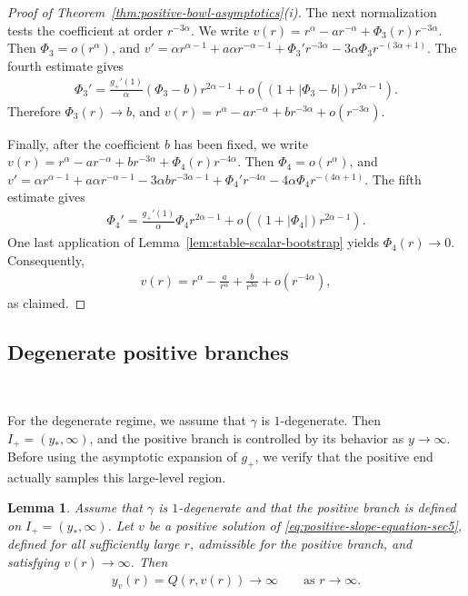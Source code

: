\documentclass{amsart}
\theoremstyle{plain}
\newtheorem{lemma}[theorem]{Lemma}
\theoremstyle{mainintrothm}
\theoremstyle{definition}
\begin{document}
\begin{proof}[Proof of Theorem~\ref{thm:positive-bowl-asymptotics}\textup{(i)}]
		\medskip
		
		The next normalization tests the coefficient at order $r^{-3\alpha}$.  We write
		$v(r)=r^\alpha-ar^{-\alpha}+\Phi_3(r)r^{-3\alpha}$.
		Then $\Phi_3=o(r^\alpha)$, and
		$v'=\alpha r^{\alpha-1}+a\alpha r^{-\alpha-1}+\Phi_3'r^{-3\alpha}-
		3\alpha\Phi_3r^{-(3\alpha+1)}$.  The fourth estimate gives
		\begin{align*}
			\Phi_3'
			=
			\frac{g_+'(1)}{\alpha}(\Phi_3-b)r^{2\alpha-1}
			+
			o\!\left((1+|\Phi_3-b|)r^{2\alpha-1}\right).
		\end{align*}
		Therefore $\Phi_3(r)\to b$, and
		$v(r)=r^\alpha-ar^{-\alpha}+br^{-3\alpha}+o(r^{-3\alpha})$.
		
		\medskip
		
		Finally, after the coefficient $b$ has been fixed, we write
		$v(r)=r^\alpha-ar^{-\alpha}+br^{-3\alpha}+
		\Phi_4(r)r^{-4\alpha}$.  Then $\Phi_4=o(r^\alpha)$, and
		$v'=\alpha r^{\alpha-1}+a\alpha r^{-\alpha-1}-3\alpha b r^{-3\alpha-1}+
		\Phi_4'r^{-4\alpha}-4\alpha\Phi_4r^{-(4\alpha+1)}$.  The fifth
		estimate gives
		\begin{align*}
			\Phi_4'
			=
			\frac{g_+'(1)}{\alpha}\Phi_4 r^{2\alpha-1}
			+
			o\!\left((1+|\Phi_4|)r^{2\alpha-1}\right).
		\end{align*}
		One last application of Lemma~\ref{lem:stable-scalar-bootstrap} yields
		$\Phi_4(r)\to0$.  Consequently,
		\begin{align*}
			v(r)
			=
			r^\alpha
			-
			\frac{a}{r^\alpha}
			+
			\frac{b}{r^{3\alpha}}
			+
			o(r^{-4\alpha}),
		\end{align*}
		as claimed.
	\end{proof}
	
	\subsection{Degenerate positive branches}\,
	\label{subsec:degenerate-positive-branches}
	
	For the degenerate regime, we assume that $\gamma$ is $1$-degenerate.  Then $I_+=(y_*,\infty)$, and
	the positive branch is controlled by its behavior as $y\to\infty$.  Before
	using the asymptotic expansion of $g_+$, we verify that the positive end
	actually samples this large-level region.
	
	\begin{lemma}
		\label{lem:eta-goes-to-infinity-degenerate}
		Assume that $\gamma$ is $1$-degenerate and that the positive branch is
		defined on $I_+=(y_*,\infty)$.  Let $v$ be a positive solution of
		\eqref{eq:positive-slope-equation-sec5}, defined for all sufficiently large
		$r$, admissible for the positive branch, and satisfying $v(r)\to\infty$.
		Then
		\begin{align*}
			y_v(r)=Q(r,v(r))\to\infty
			\qquad
			\text{as }r\to\infty.
		\end{align*}
	\end{lemma}
	
\end{document}
